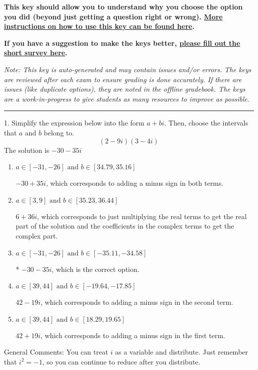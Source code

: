 \documentclass{article}[14pt]
\begin{document}
\textbf{This key should allow you to understand why you choose the option you did (beyond just getting a question right or wrong). \href{https://xronos.clas.ufl.edu/mac1105spring2020/courseDescriptionAndMisc/Exams/LearningFromResults}{More instructions on how to use this key can be found here}.}

\textbf{If you have a suggestion to make the keys better, \href{https://forms.gle/CZkbZmPbC9XALEE88}{please fill out the short survey here}.}

\textit{Note: This key is auto-generated and may contain issues and/or errors. The keys are reviewed after each exam to ensure grading is done accurately. If there are issues (like duplicate options), they are noted in the offline gradebook. The keys are a work-in-progress to give students as many resources to improve as possible.}

\rule{\textwidth}{0.4pt}

1. Simplify the expression below into the form $a+bi$. Then, choose the intervals that $a$ and $b$ belong to.
$$ (2  - 9 i)(3  - 4 i) $$ 
The solution is $ -30  - 35 i $ 

\begin{enumerate}[label=\Alph*.] 
\item $ a \in [-31, -26] \text{ and } b \in [34.79, 35.16] $ 

  $-30  + 35 i$, which corresponds to adding a minus sign in both terms. 
\item $ a \in [3, 9] \text{ and } b \in [35.23, 36.44] $ 

  $6  + 36 i$, which corresponds to just multiplying the real terms to get the real part of the solution and the coefficients in the complex terms to get the complex part. 
\item $ a \in [-31, -26] \text{ and } b \in [-35.11, -34.58] $ 

 * $-30  - 35 i$, which is the correct option. 
\item $ a \in [39, 44] \text{ and } b \in [-19.64, -17.85] $ 

  $42  - 19 i$, which corresponds to adding a minus sign in the second term. 
\item $ a \in [39, 44] \text{ and } b \in [18.29, 19.65] $ 

  $42  + 19 i$, which corresponds to adding a minus sign in the first term. 
\end{enumerate} 
 
General Comments: You can treat $i$ as a variable and distribute. Just remember that $i^2=-1$, so you can continue to reduce after you distribute.
\end{document}
